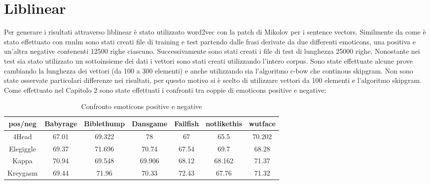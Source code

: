 \documentclass[a4paper,12pt,openright,twoside]{report}
\theoremstyle{definition}
\begin{document}
\chapter{Liblinear}
\label{ch:liblinear}
Per generare i risultati attraverso liblinear è stato utilizzato word2vec con la patch di Mikolov per i sentence vectors. Similmente da come è stato effettuato con rnnlm sono stati creati file di training e test partendo dalle frasi derivate da due differenti emoticons, una positiva e un'altra negative contenenti 12500 righe ciascuno. Successivamente sono stati creati i file di test di lunghezza 25000 righe. Nonostante nei test sia stato utilizzato un sottoinsieme dei dati i vettori sono stati creati utilizzando l'intero corpus.
Sono state effettuate alcune prove cambiando la lunghezza dei vettori (da 100 a 300 elementi) e anche utilizzando sia l'algoritmo c-bow che continous skipgram. Non sono state osservate particolari differenze nei risultati, per questo motivo si è scelto di utilizzare vettori da 100 elementi e l'algoritmo skipgram.
Come effettuato nel Capitolo 2 sono state effettuati i confronti tra coppie di emoticons positive e negative:

\begin{table}[h]
\begin{center}
\begin{tabular}{|c|c|c|c|c|c|c|}
\hline
pos/neg & Babyrage & Biblethump & Dansgame & Failfish & notlikethis & wutface \\
\hline
\hline
4Head & 67.01 &  69.322 & 78 & 67 & 65.5 & 70.202 \\
\hline
Elegiggle & 69.37 & 71.696 & 70.74 & 67.54 & 69.7 & 68.28 \\
\hline
Kappa & 70.94 & 69.548 & 69.906 & 68.12 & 68.162 & 71.37 \\
\hline
Kreygasm & 69.44 & 71.96 & 70.33 & 72.43 & 67.76 & 71.32 \\
\hline
\end{tabular}
\end{center}
\caption{Confronto emoticons positive e negative}
\label{tab:liblinearTest1}
\end{table}
\end{document}

